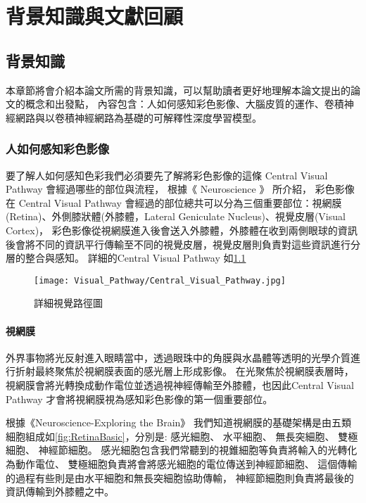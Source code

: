 \documentclass[class=NCU_thesis, crop=false]{standalone}
\begin{document}
\chapter{背景知識與文獻回顧}
\section{背景知識}

本章節將會介紹本論文所需的背景知識，可以幫助讀者更好地理解本論文提出的論文的概念和出發點，
內容包含：人如何感知彩色影像、大腦皮質的運作、卷積神經網路與以卷積神經網路為基礎的可解釋性深度學習模型。

\subsection{人如何感知彩色影像}

要了解人如何感知色彩我們必須要先了解將彩色影像的這條 Central Visual Pathway 會經過哪些的部位與流程，
根據《 Neuroscience 》 \cite{Purves2004Neuroscience3E}所介紹，
彩色影像在 Central Visual Pathway 會經過的部位總共可以分為三個重要部位：視網膜(Retina)、外側膝狀體(外膝體，Lateral Geniculate Nucleus)、視覺皮層(Visual Cortex)，
彩色影像從視網膜進入後會送入外膝體，外膝體在收到兩側眼球的資訊後會將不同的資訊平行傳輸至不同的視覺皮層，視覺皮層則負責對這些資訊進行分層的整合與感知。
詳細的Central Visual Pathway 如\cref{fig:Central_Visual_Pathway}

\begin{figure}[H]
  \centering
  \texttt{[image: Visual\_Pathway/Central\_Visual\_Pathway.jpg]}
  \caption{詳細視覺路徑圖~\cite{Purves2004Neuroscience3E}}
  \label{fig:Central_Visual_Pathway}
\end{figure}

\subsubsection{視網膜}

外界事物將光反射進入眼睛當中，透過眼珠中的角膜與水晶體等透明的光學介質進行折射最終聚焦於視網膜表面的感光層上形成影像。
在光聚焦於視網膜表層時，視網膜會將光轉換成動作電位並透過視神經傳輸至外膝體，也因此Central Visual Pathway 才會將視網膜視為感知彩色影像的第一個重要部位。

根據《Neuroscience-Exploring the Brain》\cite{bear2016neuroscience}
我們知道視網膜的基礎架構是由五類細胞組成如\cref{fig:RetinaBasic}，分別是: 感光細胞、 水平細胞、 無長突細胞、 雙極細胞、 神經節細胞。 感光細胞包含我們常聽到的視錐細胞等負責將輸入的光轉化為動作電位、 雙極細胞負責將會將感光細胞的電位傳送到神經節細胞、
這個傳輸的過程有些則是由水平細胞和無長突細胞協助傳輸，
神經節細胞則負責將最後的資訊傳輸到外膝體之中。
\end{document}
